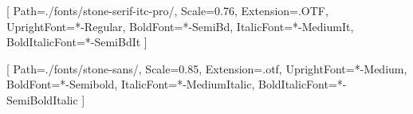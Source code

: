 \usepackage{microtype}
\usepackage{setspace}

\setlength{\parskip}{0em}
\setlength{\parindent}{1em}
\linespread{1.10}

\newcommand{\titleoriginal}{Principles of Economics}
\newcommand{\subtitleoriginal}{}
\newcommand{\originalpublisher}{The Saif House}
\newcommand{\yearoriginal}{2023}
\newcommand{\subtitletranslation}{Als intellectueel weerwoord tegen de Keynesiaanse economische denkwijze}
\newcommand{\yeartranslation}{2024}
\newcommand{\stringtranslation}{Vertaling}
\newcommand{\stringlicense}{Dit werk is gelicentieerd onder de CC BY-NC-ND 4.0-licentie. Om een kopie van deze licentie te bekijken, ga naar \url{https://creativecommons.org/licenses/by-nc-nd/4.0/}. }
\newcommand{\stringpublisher}{Uitgever}
\newcommand{\ISBNHC}{978-9916-723-91-3}
\newcommand{\ISBNSC}{978-9916-723-92-0}
\newcommand{\ISBNEBOOK}{978-9916-723-94-4}
\newcommand{\ISBNAUDIO}{978-9916-723-96-8}
\newcommand{\press}{Konsensus Network}
\newcommand{\translatorone}{Vincent Hondius}
\newcommand{\translatortwo}{Gill Mattheus}
\newcommand{\translators}{
\large\textit{\stringtranslation:}\\
\translatorone\\
\translatortwo\\
}

\setstocksize{210mm}{148mm}
\settrimmedsize{210mm}{148mm}{*}
\setbinding{8mm}
\setlrmarginsandblock{12mm}{18mm}{*}
\setulmarginsandblock{20mm}{15mm}{*}

\usepackage{fontspec}
\setmainfont{stone-serif}[
    Path=./fonts/stone-serif-itc-pro/,
    Scale=0.76,
    Extension=.OTF,
    UprightFont=*-Regular,
    BoldFont=*-SemiBd,
    ItalicFont=*-MediumIt,
    BoldItalicFont=*-SemiBdIt
    ]

\setsansfont{stone-sans}[
    Path=./fonts/stone-sans/,
    Scale=0.85,
    Extension=.otf,
    UprightFont=*-Medium,
    BoldFont=*-Semibold,
    ItalicFont=*-MediumItalic,
    BoldItalicFont=*-SemiBoldItalic
    ]

\usepackage{lettrine}
\setcounter{DefaultLines}{3}
\renewcommand{\DefaultLoversize}{0.1}
\renewcommand{\DefaultLraise}{0}
\renewcommand{\LettrineTextFont}{}
\setlength{\DefaultFindent}{\fontdimen2\font}
\setlength{\DefaultNindent}{0em}

\makeatletter
\newcommand*\halftitlepage{\begingroup %
  \setlength\drop{0.1\textheight}
  \vspace*{\drop}
  \rule{\textwidth}{0in}\par
  {\Large\sffamily\thetitle\par}
  \rule{\textwidth}{0in}\par
  \vfill
\endgroup}
\makeatother

